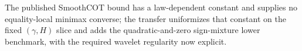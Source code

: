 The published SmoothCOT bound has a law-dependent constant and supplies no equality-local minimax converse; the transfer uniformizes that constant on the fixed \((\gamma,H)\) slice and adds the quadratic-and-zero sign-mixture lower benchmark, with the required wavelet regularity now explicit.